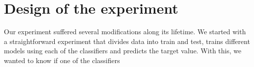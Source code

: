 \section{Design of the experiment}
Our experiment suffered several modifications along its lifetime. We started with a straightforward experiment that divides data into train and test, trains different models using each of the classifiers and predicts the target value. With this, we wanted to know if one of the classifiers 